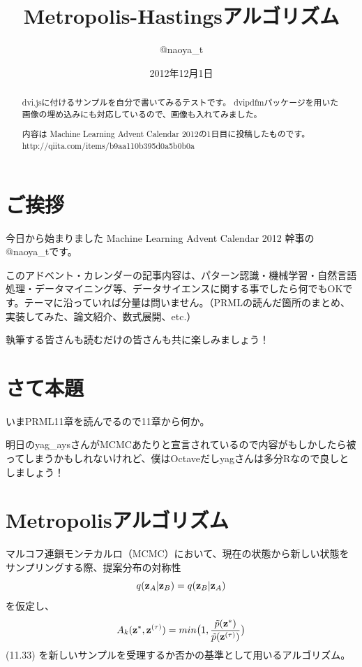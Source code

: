 \documentclass{jsarticle}
\begin{document}
\date{2012年12月1日}
\title{Metropolis-Hastingsアルゴリズム}
\author{@naoya\_t}
\maketitle

\begin{abstract}
dvi.jsに付けるサンプルを自分で書いてみるテストです。
dvipdfmパッケージを用いた画像の埋め込みにも対応しているので、画像も入れてみました。

内容は Machine Learning Advent Calendar 2012の1日目に投稿したものです。\\
http://qiita.com/items/b9aa110b395d0a5b0b0a
\end{abstract}
\def\naoyat{@naoya\_t}

\section{ご挨拶}

今日から始まりました Machine Learning Advent Calendar 2012 幹事の\naoyat です。

このアドベント・カレンダーの記事内容は、パターン認識・機械学習・自然言語処理・データマイニング等、データサイエンスに関する事でしたら何でもOKです。テーマに沿っていれば分量は問いません。（PRMLの読んだ箇所のまとめ、実装してみた、論文紹介、数式展開、etc.）

執筆する皆さんも読むだけの皆さんも共に楽しみましょう！

\section{さて本題}
いまPRML11章を読んでるので11章から何か。

明日のyag\_aysさんがMCMCあたりと宣言されているので内容がもしかしたら被ってしまうかもしれないけれど、僕はOctaveだしyagさんは多分Rなので良しとしましょう！

\section{Metropolisアルゴリズム}
マルコフ連鎖モンテカルロ（MCMC）において、現在の状態から新しい状態をサンプリングする際、提案分布の対称性
\begin{equation}
q({\bf z}_A|{\bf z}_B)=q({\bf z}_B|{\bf z}_A)
\nonumber\end{equation}
を仮定し、
\begin{equation}
\displaystyle A_k({\bf z}^*,{\bf z}^{(\tau)})=min\bigl(1,\frac{\tilde{p}({\bf z}^*)}{\tilde{p}({\bf z}^{(\tau)})}\bigr)
\nonumber\end{equation}
 (11.33) を新しいサンプルを受理するか否かの基準として用いるアルゴリズム。
\end{document}
